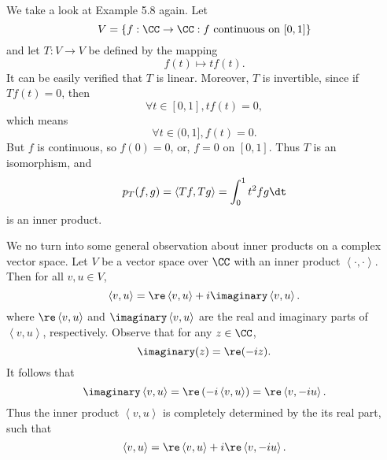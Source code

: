 \documentclass[linearalgebraII]{subfiles}
\begin{document}
    \begin{example}
        We take a look at Example 5.8 again. Let
        \begin{equation*}
            V = \left\lbrace f:\CC\to\CC: f\text{ continuous on }[0,1] \right\rbrace 
        \end{equation*}
        and let $T:V\to V$ be defined by the mapping
        \begin{equation*}
            f(t)\mapsto tf(t).
        \end{equation*}
        It can be easily verified that $T$ is linear. Moreover, $T$ is invertible, since if $Tf(t) = 0$, then
        \begin{equation*}
            \forall t\in[0,1], tf(t) = 0,
        \end{equation*}
        which means
        \begin{equation*}
            \forall t\in(0,1], f(t) = 0.
        \end{equation*}
        But $f$ is continuous, so $f(0) = 0$, or, $f=0$ on $[0,1]$. Thus $T$ is an isomorphism, and
        \begin{equation*}
            p_T(f,g) = \left\langle Tf, Tg\right\rangle = \int^{1}_{0} t^2fg\dt
        \end{equation*}
        is an inner product.
    \end{example}

    \begin{remark}
        We no turn into some general observation about inner products on a complex vector space. Let $V$ be a vector space over $\CC$ with an inner product $\left\langle \cdot, \cdot\right\rangle $. Then for all $v,u\in V$,
        \begin{equation*}
            \left\langle v, u\right\rangle = \re\left\langle v, u\right\rangle + i\imaginary\left\langle v, u\right\rangle .
        \end{equation*}
        where $\re\left\langle v, u\right\rangle$ and $\imaginary\left\langle v, u\right\rangle$ are the real and imaginary parts of $\left\langle v, u\right\rangle $, respectively. Observe that for any $z\in\CC$,
        \begin{equation*}
            \imaginary(z) = \re(-iz).
        \end{equation*}
        It follows that
        \begin{equation*}
            \imaginary\left\langle v, u\right\rangle = \re\left( -i\left\langle v, u\right\rangle  \right) = \re\left\langle v, -iu\right\rangle .
        \end{equation*}
        Thus the inner product $\left\langle v,u \right\rangle$ is completely determined by the its real part, such that
        \begin{equation*}
            \left\langle v, u\right\rangle = \re\left\langle v, u\right\rangle + i\re\left\langle v, -iu\right\rangle.
        \end{equation*}
    \end{remark}
\end{document}
